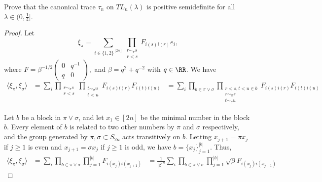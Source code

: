 \documentclass{article}
\begin{document}
 Prove that the canonical trace $\tau_n$ on $TL_n(\lambda)$ is positive semidefinite for all $\lambda \in (0, \frac{1}{4}]$.
  \begin{proof}
    Let $$\xi_\pi = \sum_{i \in \{1,2\}^{[2n]}} \prod_{\substack{r \sim_\pi s\\ r< s}} F_{i(s)i(r)} e_i,$$
      where $F = \beta^{-1/2} \begin{pmatrix} 0 & q^{-1} \\ q & 0 \end{pmatrix},$ and $\beta = q^2 + q^{-2}$ with $q \in \RR$.   We have
      \begin{align*}
        \langle \xi_\pi, \xi_\sigma \rangle & = \sum_i \prod_{\substack{r \sim_\pi s\\ r < s}} \prod_{\substack{t \sim_\sigma u\\ t < u}} F_{i(s)i(r)} F_{i(t) i(u)} 
        & = \sum_i \prod_{b \in \pi \vee \sigma} \prod_{\substack{r<s, t<u \in b\\ r \sim_\pi s \\ t \sim_\sigma u }} F_{i(s)i(r)} F_{i(t) i(u)} 
      \end{align*}

      Let $b$ be a block in $\pi \vee \sigma$, and let $x_1 \in [2n]$ be the minimal number in the block $b$.  Every element of $b$ is related to two other numbers by $\pi$ and $\sigma$ respectively, and the group generated by $\pi, \sigma \subset S_{2n}$ acts transitively on $b$.  Letting $x_{j+1} = \pi x_{j}$ if $j \ge 1$ is even and $x_{j+1} = \sigma x_j$ if $j \ge 1$ is odd, we have $b = \{x_j\}_{j = 1}^{|b|}$.  Thus,
      \begin{align*}
        \langle \xi_\pi, \xi_\sigma \rangle &  = \sum_i \prod_{b \in \pi \vee \sigma} \prod_{j = 1}^{|b|} F_{i(x_j)i(x_{j+1})}
        & =
        \frac{1}{|\beta|^n} \sum_i \prod_{b \in \pi \vee \sigma} \prod_{j = 1}^{|b|} \sqrt{\beta} F_{i(x_j)i(x_{j+1})} 
      \end{align*}


\end{proof}
\end{document}

